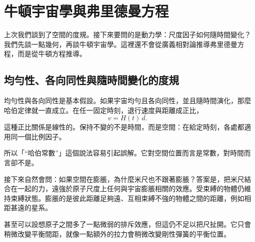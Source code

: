 \chapter{牛頓宇宙學與弗里德曼方程}

上次我們談到了空間的度規。接下來要問的是動力學：尺度因子如何隨時間變化？我們先談一點幾何，再談牛頓宇宙學。這裡還不會從廣義相對論推導弗里德曼方程，而是從牛頓方程推導。

\section{均勻性、各向同性與隨時間變化的度規}

均勻性與各向同性是基本假設。如果宇宙均勻且各向同性，並且隨時間演化，那麼哈伯定律就一直成立。在任一固定時刻，退行速度與距離成正比，
\begin{equation}
v = H(t)\,d.
\end{equation}
這種正比關係是線性的。保持不變的不是時間，而是空間：在給定時刻，各處都適用同一個比例因子。

\begin{classroomqa}
\end{classroomqa}

所以「``哈伯常數''」這個說法容易引起誤解。它對空間位置而言是常數，對時間而言卻不是。

接下來自然會問：如果空間在膨脹，為什麼米尺也不跟著膨脹？答案是，把米尺結合在一起的力，遠強於原子尺度上任何與宇宙膨脹相關的效應。受束縛的物體仍維持束縛狀態。膨脹的是彼此距離足夠遠、互相束縛不強的物體之間的距離，例如相距甚遠的星系。

\begin{classroomqa}
\end{classroomqa}

甚至可以設想原子之間多了一點微弱的排斥效應，但這仍不足以把尺扯開。它只會稍微改變平衡間距，就像一點額外的拉力會稍微改變剛性彈簧的平衡位置。

\begin{classroomqa}
\end{classroomqa}

